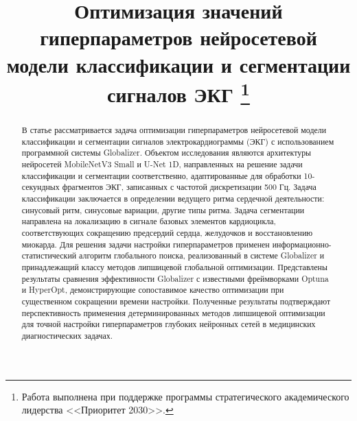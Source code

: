 \documentclass[11pt, oneside, a4paper]{article}
\begin{document}

\title{Оптимизация значений гиперпараметров нейросетевой модели классификации и сегментации сигналов ЭКГ \footnote{Работа выполнена при поддержке программы стратегического академического лидерства <<Приоритет 2030>>.}}


\begin{abstract}
В статье рассматривается задача оптимизации гиперпараметров нейросетевой модели классификации и сегментации сигналов электрокардиограммы (ЭКГ) с использованием программной системы Globalizer. Объектом исследования являются архитектуры нейросетей MobileNetV3 Small и U-Net 1D, направленных на решение задачи классификации и сегментации соответственно, адаптированные для обработки 10-секундных фрагментов ЭКГ, записанных с частотой дискретизации 500 Гц. 
Задача классификации заключается в определении ведущего ритма сердечной деятельности: синусовый ритм, синусовые вариации, другие типы ритма. Задача сегментации направлена на локализацию в сигнале базовых элементов кардиоцикла, соответствующих сокращению предсердий сердца, желудочков и восстановлению миокарда. 
Для решения задачи настройки гиперпараметров применен информационно-статистический алгоритм глобального поиска, реализованный в системе Globalizer и принадлежащий классу методов липшицевой глобальной оптимизации. 
Представлены результаты сравнения эффективности Globalizer с известными фреймворками Optuna и HyperOpt, демонстрирующие сопоставимое качество оптимизации при существенном сокращении времени настройки. Полученные результаты подтверждают перспективность применения детерминированных методов липшицевой оптимизации для точной настройки гиперпараметров глубоких нейронных сетей в медицинских диагностических задачах.
\end{abstract}
\end{document}
